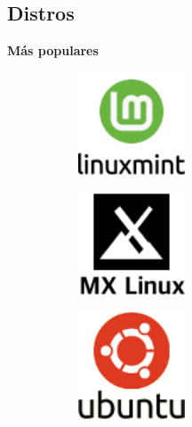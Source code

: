 \documentclass[aspectratio=43]{beamer}
\begin{document}
    \subsection{Distros}
     \begin{frame}{\subsecname}{}
        \centering\textbf{Más populares}
        \begin{figure}[b]
            \centering
            \begin{subfigure}{.3\textwidth}
                \centering
                \includegraphics[width=0.35\textwidth]{img/mint.png}
            \end{subfigure}
            \centering
            \begin{subfigure}{.3\textwidth}
                \centering
                \includegraphics[width=0.35\textwidth]{img/mx.png}
            \end{subfigure}
            \begin{subfigure}{.3\textwidth}
                \centering
                \includegraphics[width=0.35\textwidth]{img/ubuntu.png}
            \end{subfigure}

\end{figure}
\end{frame}
\end{document}
